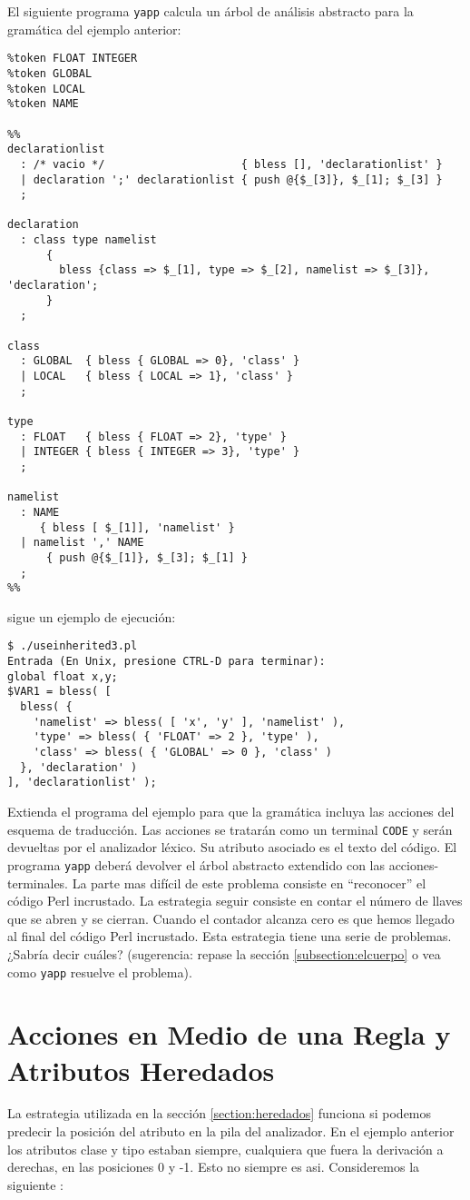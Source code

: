 \begin{exercise}
El siguiente programa \verb|yapp| calcula 
un árbol de análisis abstracto para la gramática
del ejemplo anterior:
\begin{verbatim}
%token FLOAT INTEGER 
%token GLOBAL 
%token LOCAL 
%token NAME

%%
declarationlist 
  : /* vacio */                     { bless [], 'declarationlist' } 
  | declaration ';' declarationlist { push @{$_[3]}, $_[1]; $_[3] }
  ;

declaration
  : class type namelist 
      { 
        bless {class => $_[1], type => $_[2], namelist => $_[3]}, 'declaration'; 
      }
  ;

class
  : GLOBAL  { bless { GLOBAL => 0}, 'class' } 
  | LOCAL   { bless { LOCAL => 1}, 'class' }
  ;

type
  : FLOAT   { bless { FLOAT => 2}, 'type' } 
  | INTEGER { bless { INTEGER => 3}, 'type' }
  ;

namelist
  : NAME  
     { bless [ $_[1]], 'namelist' }
  | namelist ',' NAME 
      { push @{$_[1]}, $_[3]; $_[1] }
  ;
%%
\end{verbatim}
sigue un ejemplo de ejecución:
\begin{verbatim}
$ ./useinherited3.pl
Entrada (En Unix, presione CTRL-D para terminar):
global float x,y;
$VAR1 = bless( [
  bless( {
    'namelist' => bless( [ 'x', 'y' ], 'namelist' ),
    'type' => bless( { 'FLOAT' => 2 }, 'type' ),
    'class' => bless( { 'GLOBAL' => 0 }, 'class' )
  }, 'declaration' )
], 'declarationlist' );
\end{verbatim}

Extienda el programa del ejemplo para que la gramática 
incluya las acciones del esquema de traducción.
Las acciones se tratarán como un terminal \verb|CODE|
y serán devueltas por el analizador léxico. Su atributo
asociado es el texto del código. El programa 
\verb|yapp| deberá devolver el árbol abstracto
extendido con las acciones-terminales.
La parte mas difícil de este problema consiste en ``reconocer''
el código Perl incrustado. La estrategia seguir consiste
en contar el número de llaves que se abren y se cierran.
Cuando el contador alcanza cero es que hemos llegado
al final del código Perl incrustado. Esta estrategia
tiene una serie de problemas. ¿Sabría decir cuáles?
(sugerencia: repase la sección \ref{subsection:elcuerpo} 
o vea como \verb|yapp| resuelve el problema).
\end{exercise}

\section{Acciones en Medio de una Regla y Atributos Heredados}
\label{section:mediaregla}
La estrategia utilizada en la sección \ref{section:heredados} funciona
si podemos predecir la posición del atributo en la pila del analizador.
En el ejemplo anterior los atributos clase y tipo estaban siempre,
cualquiera que fuera la derivación a derechas, 
en las posiciones 0 y -1. Esto no siempre es asi. Consideremos
la siguiente :


